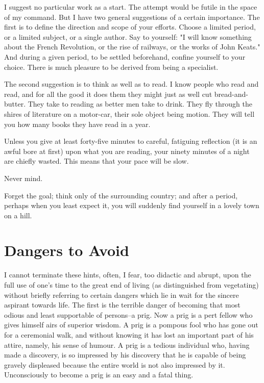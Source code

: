 I suggest no particular work as a start.  The attempt would be futile
in the space of my command.  But I have two general suggestions of a
certain importance.  The first is to define the direction and scope of
your efforts. Choose a limited period, or a limited subject, or a
single author.  Say to yourself:  "I will know something about the
French Revolution, or the rise of railways, or the works of John
Keats."  And during a given period, to be settled beforehand, confine
yourself to your choice.  There is much pleasure to be derived from
being a specialist.

The second suggestion is to think as well as to read.  I know people
who read and read, and for all the good it does them they might just as
well cut bread-and-butter.  They take to reading as better men take to
drink. They fly through the shires of literature on a motor-car, their
sole object being motion.  They will tell you how many books they have
read in a year.

Unless you give at least forty-five minutes to careful, fatiguing
reflection (it is an awful bore at first) upon what you are reading,
your ninety minutes of a night are chiefly wasted.  This means that
your pace will be slow.

Never mind.

Forget the goal; think only of the surrounding country; and after a
period, perhaps when you least expect it, you will suddenly find
yourself in a lovely town on a hill.



\addtocounter{chapter}{1}\chapter*{Dangers to Avoid}

I cannot terminate these hints, often, I fear, too didactic and abrupt,
upon the full use of one's time to the great end of living (as
distinguished from vegetating) without briefly referring to certain
dangers which lie in wait for the sincere aspirant towards life.  The
first is the terrible danger of becoming that most odious and least
supportable of persons--a prig. Now a prig is a pert fellow who gives
himself airs of superior wisdom. A prig is a pompous fool who has gone
out for a ceremonial walk, and without knowing it has lost an important
part of his attire, namely, his sense of humour.  A prig is a tedious
individual who, having made a discovery, is so impressed by his
discovery that he is capable of being gravely displeased because the
entire world is not also impressed by it. Unconsciously to become a
prig is an easy and a fatal thing.

